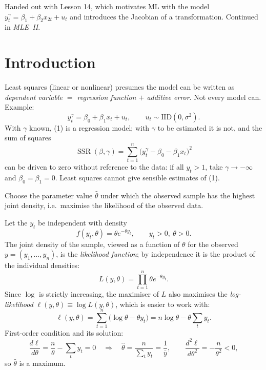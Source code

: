 \documentclass[11pt]{article}
\begin{document}

 Handed out with Lesson 14, which motivates ML with the model
$y_{t}^{\gamma}=\beta_{1}+\beta_{2}x_{2t}+u_{t}$ and introduces the Jacobian of a transformation.
Continued in \emph{MLE~II}.

\section{Introduction}

Least squares (linear or nonlinear) presumes the model can be written as
\emph{dependent variable $=$ regression function $+$ additive error}. Not every model can. Example:
\begin{equation}\tag{1}
 y_{t}^{\gamma}=\beta_{0}+\beta_{1}x_{t}+u_{t}, \qquad u_{t}\sim\text{IID}(0,\sigma^{2}).
\end{equation}
With $\gamma$ known, (1) is a regression model; with $\gamma$ to be estimated it is not, and the
sum of squares
\begin{equation}\tag{2}
 \operatorname{SSR}(\beta,\gamma)=\sum_{t=1}^{n}\bigl(y_{t}^{\gamma}-\beta_{0}-\beta_{1}x_{t}\bigr)^{2}
\end{equation}
can be driven to zero without reference to the data: if all $y_{t}>1$, take
$\gamma\to-\infty$ and $\beta_{0}=\beta_{1}=0$. Least squares cannot give sensible estimates of (1).

Choose the parameter value $\hat\theta$ under which the observed sample has the highest
joint density, i.e.\ maximise the likelihood of the observed data.

Let the $y_{t}$ be independent with density
\begin{equation}\tag{3}
 f(y_{t},\theta)=\theta e^{-\theta y_{t}}, \qquad y_{t}>0,\ \theta>0 .
\end{equation}
The joint density of the sample, viewed as a function of $\theta$ for the observed
$y=(y_{1},\ldots,y_{n})$, is the \emph{likelihood function}; by independence it is the product
of the individual densities:
\begin{equation}\tag{4}
 L(y,\theta)=\prod_{t=1}^{n}\theta e^{-\theta y_{t}} .
\end{equation}
Since $\log$ is strictly increasing, the maximiser of $L$ also maximises the
\emph{log-likelihood} $\ell(y,\theta)\equiv\log L(y,\theta)$, which is easier to work with:
\[ \ell(y,\theta)=\sum_{t=1}^{n}\bigl(\log\theta-\theta y_{t}\bigr)=n\log\theta-\theta\sum_{t}y_{t}. \]
First-order condition and its solution:
\[ \frac{d\ell}{d\theta}=\frac{n}{\theta}-\sum_{t}y_{t}=0
   \quad\Longrightarrow\quad \hat\theta=\frac{n}{\sum_{t}y_{t}}=\frac{1}{\bar y}, \qquad
   \frac{d^{2}\ell}{d\theta^{2}}=-\frac{n}{\theta^{2}}<0, \]
so $\hat\theta$ is a maximum.
\end{document}
